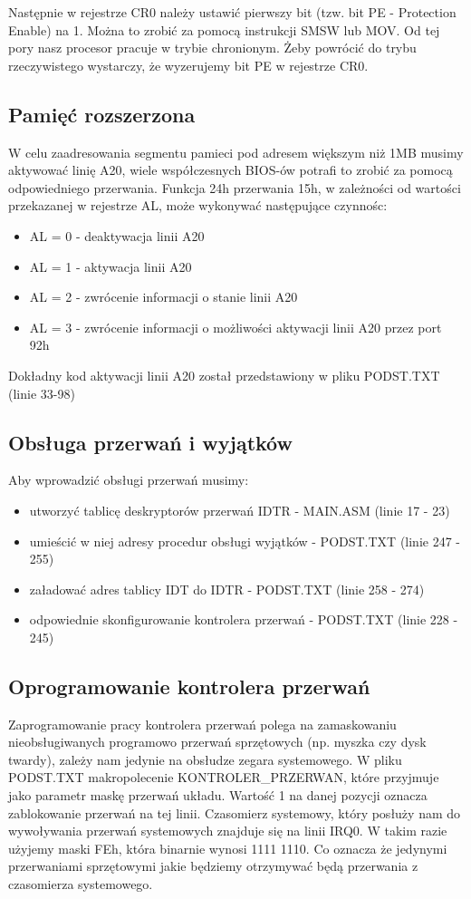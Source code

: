 \documentclass[a4paper,12pt]{article}
\begin{document}
Następnie w rejestrze CR0 należy ustawić pierwszy bit (tzw. bit PE - Protection Enable) na 1. Można to zrobić za pomocą instrukcji SMSW lub MOV. Od tej pory nasz procesor pracuje w trybie chronionym. Żeby powrócić do trybu rzeczywistego wystarczy, że wyzerujemy bit PE w rejestrze CR0.

\subsection{Pamięć rozszerzona}
W celu zaadresowania segmentu pamieci pod adresem większym niż 1MB musimy aktywować linię A20, wiele współczesnych BIOS-ów potrafi to zrobić za pomocą odpowiedniego przerwania. Funkcja 24h przerwania 15h, w zależności od wartości przekazanej w rejestrze AL, może wykonywać następujące czynnośc: 
\begin{itemize}
\item{AL = 0 - deaktywacja linii A20}
\item{AL = 1 - aktywacja linii A20}
\item{AL = 2 - zwrócenie informacji o stanie linii A20}
\item{AL = 3 - zwrócenie informacji o możliwości aktywacji linii A20 przez port 92h}
\end{itemize}

Dokładny kod aktywacji linii A20 został przedstawiony w pliku PODST.TXT (linie 33-98)


\subsection{Obsługa przerwań i wyjątków}
Aby wprowadzić obsługi przerwań musimy:
\begin{itemize}
\item{utworzyć tablicę deskryptorów przerwań IDTR - MAIN.ASM (linie 17 - 23)}
\item{umieścić w niej adresy procedur obsługi wyjątków - PODST.TXT (linie 247 - 255) }
\item{załadować adres tablicy IDT do IDTR - PODST.TXT (linie 258 - 274)}
\item{odpowiednie skonfigurowanie kontrolera przerwań - PODST.TXT (linie 228 - 245)}
\end{itemize}

		\subsection{Oprogramowanie kontrolera przerwań}
Zaprogramowanie pracy kontrolera przerwań polega na zamaskowaniu nieobsługiwanych programowo przerwań sprzętowych (np. myszka czy dysk twardy), zależy nam jedynie na obsłudze zegara systemowego. W pliku PODST.TXT makropolecenie KONTROLER\_PRZERWAN, które przyjmuje jako parametr maskę przerwań układu. Wartość 1 na danej pozycji oznacza zablokowanie przerwań na tej linii. Czasomierz systemowy, który posłuży nam do wywoływania przerwań systemowych znajduje się na linii IRQ0. W takim razie użyjemy maski FEh, która binarnie wynosi 1111 1110. Co oznacza że jedynymi przerwaniami sprzętowymi jakie będziemy otrzymywać będą przerwania z czasomierza systemowego.
\end{document}
